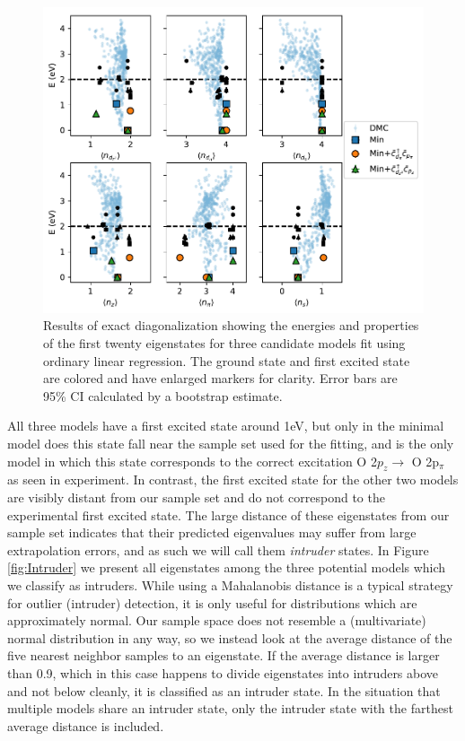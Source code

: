 \documentclass{article}
\begin{document}
\begin{figure}[H]
\centering
\includegraphics[width=0.7\linewidth]{../qwalk/old/ub3lyp_s1_/analysis/figs/init_ed.pdf}
\caption{Results of exact diagonalization showing the energies and properties of the first twenty eigenstates for three candidate models fit using ordinary linear regression. The ground state and first excited state are colored and have enlarged markers for clarity. Error bars are 95\% CI calculated by a bootstrap estimate.}
\label{fig:InitED}
\end{figure}

All three models have a first excited state around 1eV, but only in the minimal model does this state fall near the sample set used for the fitting, and is the only model in which this state corresponds to the correct excitation O 2$p_z \rightarrow $ O 2p$_\pi$ as seen in experiment.
In contrast, the first excited state for the other two models are visibly distant from our sample set and do not correspond to the experimental first excited state.
The large distance of these eigenstates from our sample set indicates that their predicted eigenvalues may suffer from large extrapolation errors, and as such we will call them \textit{intruder} states.
In Figure \ref{fig:Intruder} we present all eigenstates among the three potential models which we classify as intruders.
While using a Mahalanobis distance is a typical strategy for outlier (intruder) detection, it is only useful for distributions which are approximately normal.
Our sample space does not resemble a (multivariate) normal distribution in any way, so we instead look at the average distance of the five nearest neighbor samples to an eigenstate.
If the average distance is larger than 0.9, which in this case happens to divide eigenstates into intruders above and not below cleanly, it is classified as an intruder state.
In the situation that multiple models share an intruder state, only the intruder state with the farthest average distance is included.
\end{document}
